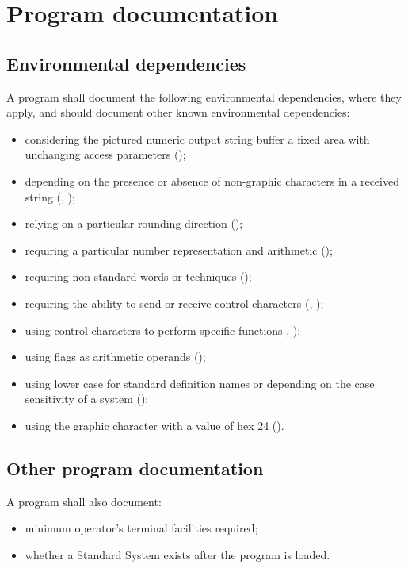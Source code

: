 \section{Program documentation} %
\label{doc:program}

\subsection{Environmental dependencies} %

A program shall document the following environmental dependencies,
where they apply, and should document other known environmental
dependencies:

\begin{itemize}

\item considering the pictured numeric output string buffer a fixed
	area with unchanging access parameters
	();

\item depending on the presence or absence of non-graphic characters
	in a received string (,
	);

\item relying on a particular rounding direction
	();

\item requiring a particular number representation and arithmetic
	();

\item requiring non-standard words or techniques
	();

\item requiring the ability to send or receive control characters
	(,
	);

\item using control characters to perform specific functions
	, );

\item using flags as arithmetic operands
	();

\item using lower case for standard definition names or depending
	on the case sensitivity of a system
	();

\item using the graphic character with a value of hex 24
	().

\end{itemize}

\subsection{Other program documentation} %

A program shall also document:

\begin{itemize}

\item minimum operator's terminal facilities required;

\item whether a Standard System exists after the program is loaded.

\end{itemize}
